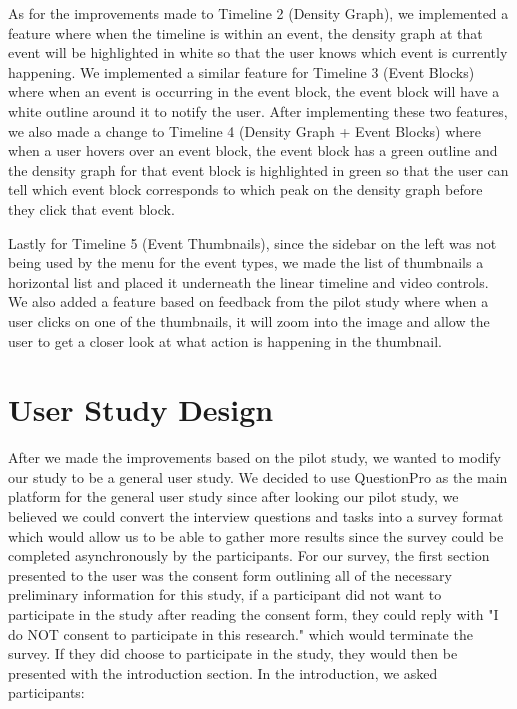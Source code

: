 \documentclass[doublespace,draft,nopageskip]{VTthesis} %
\begin{document}
As for the improvements made to Timeline 2 (Density Graph), we implemented a feature where when the timeline is within an event, the density graph at that event will be highlighted in white so that the user knows which event is currently happening. We implemented a similar feature for Timeline 3 (Event Blocks) where when an event is occurring in the event block, the event block will have a white outline around it to notify the user. After implementing these two features, we also made a change to Timeline 4 (Density Graph + Event Blocks) where when a user hovers over an event block, the event block has a green outline and the density graph for that event block is highlighted in green so that the user can tell which event block corresponds to which peak on the density graph before they click that event block.

Lastly for Timeline 5 (Event Thumbnails), since the sidebar on the left was not being used by the menu for the event types, we made the list of thumbnails a horizontal list and placed it underneath the linear timeline and video controls. We also added a feature based on feedback from the pilot study where when a user clicks on one of the thumbnails, it will zoom into the image and allow the user to get a closer look at what action is happening in the thumbnail. 

\section{User Study Design} \label{se:one_section}

After we made the improvements based on the pilot study, we wanted to modify our study to be a general user study. We decided to use QuestionPro as the main platform for the general user study since after looking our pilot study, we believed we could convert the interview questions and tasks into a survey format which would allow us to be able to gather more results since the survey could be completed asynchronously by the participants. For our survey, the first section presented to the user was the consent form outlining all of the necessary preliminary information for this study, if a participant did not want to participate in the study after reading the consent form, they could reply with "I do NOT consent to participate in this research." which would terminate the survey. If they did choose to participate in the study, they would then be presented with the introduction section. In the introduction, we asked participants: 
\end{document}
